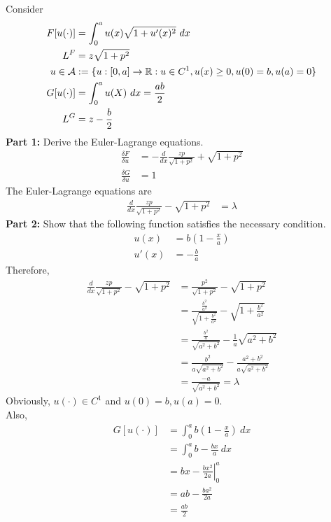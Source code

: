 \documentclass{article}
\begin{document}
	\begin{example}
		Consider
		\begin{align}
			F[u(\cdot)] &= \int_0^a u(x) \sqrt{1 + u'(x)^2}\ dx \\
			L^F &= z \sqrt{1 + p^2} \\
			u \in \mathcal{{A}} &:= \{u: [0, a] \to \mathbb{R}: u \in C^1, u(x) \geq 0, u(0) = b, u(a) = 0 \} \\
			G[u(\cdot)] &= \int_0^a u(X)\ dx = \frac{ab}{2} \\
			L^G &= z - \frac{b}{2}
		\end{align}
		\textbf{Part 1:} Derive the Euler-Lagrange equations.
		\begin{align}
			\frac{\delta F}{\delta u} &= - \frac{d}{dx} \frac{z p}{\sqrt{1+p^2}} + \sqrt{1 + p^2} \\
			\frac{\delta G}{\delta u} &= 1
		\end{align}
		The Euler-Lagrange equations are
		\begin{align}
			\frac{d}{dx} \frac{z p}{\sqrt{1+p^2}} - \sqrt{1 + p^2} &= \lambda
		\end{align}
		\textbf{Part 2:} Show that the following function satisfies the necessary condition.
		\begin{align}
			u(x) &= b \left(1 - \frac{x}{a}\right) \\
			u'(x) &= - \frac{b}{a}
		\end{align}
		Therefore,
		\begin{align}
			\frac{d}{dx} \frac{z p}{\sqrt{1+p^2}} - \sqrt{1 + p^2} &= \frac{p^2}{\sqrt{1+p^2}} - \sqrt{1 + p^2} \\
			&= \frac{\frac{b^2}{a^2}}{\sqrt{1 + \frac{b^2}{a^2}}} - \sqrt{1 + \frac{b^2}{a^2}} \\
			&= \frac{\frac{b^2}{a}}{\sqrt{a^2 + b^2}} - \frac{1}{a} \sqrt{a^2 + b^2} \\\
			&= \frac{b^2}{a \sqrt{a^2 + b^2}} - \frac{a^2 + b^2}{a \sqrt{a^2 + b^2}} \\
			&= \frac{-a}{\sqrt{a^2 + b^2}} = \lambda
		\end{align}
		Obviously, $u(\cdot) \in C^1$ and $u(0) = b, u(a) = 0$. \\
		Also, 
		\begin{align}
			G[u(\cdot)] &= \int_0^a b(1 - \frac{x}{a})\ dx \\ 
			&= \int_0^a b - \frac{bx}{a}\ dx \\
			&= \left. bx - \frac{bx^2}{2a} \right|_0^a \\
			&= ab - \frac{ba^2}{2a} \\
			&= \frac{ab}{2}
		\end{align}
	\end{example}
	
\end{document}
